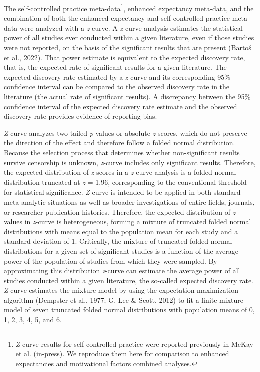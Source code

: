 \documentclass[
  man, donotrepeattitle,floatsintext]{apa7}
\begin{document}
The self-controlled practice meta-data\footnote{\emph{Z}-curve results for self-controlled practice were reported previously in McKay et al. (in-press). We reproduce them here for comparison to enhanced expectancies and motivational factors combined analyses.}, enhanced expectancy meta-data, and the combination of both the enhanced expectancy and self-controlled practice meta-data were analyzed with a \emph{z}-curve. A \emph{z}-curve analysis estimates the statistical power of all studies ever conducted within a given literature, even if those studies were not reported, on the basis of the significant results that are present (Bartoš et al., 2022). That power estimate is equivalent to the expected discovery rate, that is, the expected rate of significant results for a given literature. The expected discovery rate estimated by a \emph{z}-curve and its corresponding 95\% confidence interval can be compared to the observed discovery rate in the literature (the actual rate of significant results). A discrepancy between the 95\% confidence interval of the expected discovery rate estimate and the observed discovery rate provides evidence of reporting bias.

\emph{Z}-curve analyzes two-tailed \emph{p}-values or absolute \emph{z}-scores, which do not preserve the direction of the effect and therefore follow a folded normal distribution. Because the selection process that determines whether non-significant results survive censorship is unknown, \emph{z}-curve includes only significant results. Therefore, the expected distribution of \emph{z}-scores in a \emph{z}-curve analysis is a folded normal distribution truncated at \emph{z} = 1.96, corresponding to the conventional threshold for statistical significance. \emph{Z}-curve is intended to be applied in both standard meta-analytic situations as well as broader investigations of entire fields, journals, or researcher publication histories. Therefore, the expected distribution of \emph{z}-values in \emph{z}-curve is heterogeneous, forming a mixture of truncated folded normal distributions with means equal to the population mean for each study and a standard deviation of 1. Critically, the mixture of truncated folded normal distributions for a given set of significant studies is a function of the average power of the population of studies from which they were sampled. By approximating this distribution \emph{z}-curve can estimate the average power of all studies conducted within a given literature, the so-called expected discovery rate. \emph{Z}-curve estimates the mixture model by using the expectation maximization algorithm (Dempster et al., 1977; G. Lee \& Scott, 2012) to fit a finite mixture model of seven truncated folded normal distributions with population means of 0, 1, 2, 3, 4, 5, and 6.
\end{document}
